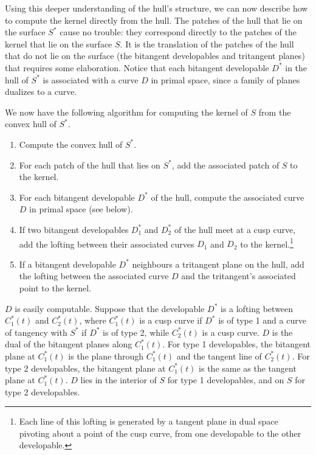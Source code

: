 \documentclass{elsart}
\begin{document}
Using this deeper understanding of the hull's structure,
we can now describe how to compute the kernel directly from the hull.
The patches of the hull that lie on the surface $S^*$
cause no trouble: they correspond directly
to the patches of the kernel that lie on the surface $S$.
It is the translation of the patches of the hull that do not lie on the surface 
(the bitangent developables and tritangent planes)
that requires some elaboration.
Notice that each bitangent developable $D^*$ in the hull of $S^*$ 
is associated with a curve $D$ in primal space, since a family of planes dualizes to a curve.

We now have the following algorithm for computing the kernel of $S$ 
from the convex hull of $S^*$.

\begin{enumerate}
\item Compute the convex hull of $S^*$.
\item For each patch of the hull that lies on $S^*$, add the associated patch of $S$
	to the kernel.
\item For each bitangent developable $D^*$ of the hull, compute the associated curve $D$ in primal space
  (see below).
\item If two bitangent developables $D_1^*$ and $D_2^*$ of the hull meet at a cusp curve, 
  add the lofting between their associated curves $D_1$ and $D_2$ to the kernel.\footnote{
    Each line of this lofting is generated by a tangent plane in dual space pivoting 
    about a point of the cusp curve, from one developable to the other developable.}
\item If a bitangent developable $D^*$ neighbours a tritangent plane on the hull,
	add the lofting between the associated curve $D$ and the tritangent's 
	associated point to the kernel.
\end{enumerate}

$D$ is easily computable.
Suppose that the developable $D^*$ is a lofting between $C^*_1(t)$ and $C^*_2(t)$,
where $C^*_1(t)$ is a cusp curve if $D^*$ is of type 1 and
a curve of tangency with $S^*$ if $D^*$ is of type 2,
while $C^*_2(t)$ is a cusp curve.
$D$ is the dual of the bitangent planes along $C^*_1(t)$.
For type 1 developables, the bitangent plane at $C^*_1(t)$ is the plane through
$C^*_1(t)$ and the tangent line of $C^*_2(t)$.
For type 2 developables, the bitangent plane at $C^*_1(t)$ is the same as the tangent plane
at $C^*_1(t)$.
$D$ lies in the interior of $S$ for type 1 developables,
and on $S$ for type 2 developables.
\end{document}
